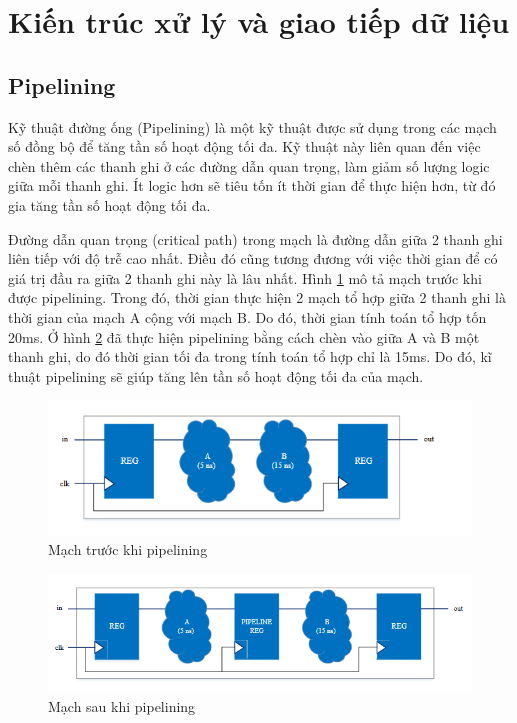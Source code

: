 \section{Kiến trúc xử lý và giao tiếp dữ liệu}
\subsection{Pipelining}
Kỹ thuật đường ống (Pipelining) là một kỹ thuật được sử dụng trong các mạch số đồng bộ để tăng tần số hoạt động tối đa. Kỹ thuật này liên quan đến việc chèn thêm các thanh ghi ở các đường dẫn quan trọng, làm giảm số lượng logic giữa mỗi thanh ghi. Ít logic hơn sẽ tiêu tốn ít thời gian để thực hiện hơn, từ đó gia tăng tần số hoạt động tối đa.

Đường dẫn quan trọng (critical path) trong mạch là đường dẫn giữa 2 thanh ghi liên tiếp với độ trễ cao nhất. Điều đó cũng tương đương với việc thời gian để có giá trị đầu ra giữa 2 thanh ghi này là lâu nhất.  Hình \ref{fig:pipeline1} mô tả mạch trước khi được pipelining. Trong đó, thời gian thực hiện 2 mạch tổ hợp giữa 2 thanh ghi là thời gian của mạch A cộng với mạch B. Do đó, thời gian tính toán tổ hợp tốn 20ms. Ở hình \ref{fig:pipeline2} đã thực hiện pipelining bằng cách chèn vào giữa A và B một thanh ghi, do đó thời gian tối đa trong tính toán tổ hợp chỉ là 15ms. Do đó, kĩ thuật pipelining sẽ giúp tăng lên tần số hoạt động tối đa của mạch. 
\begin{figure}[!ht]
    \centering
    \includegraphics[width=\linewidth]{figures/pipeline1.png}
    \caption{Mạch trước khi pipelining}
    \label{fig:pipeline1}
\end{figure}
\begin{figure}[!ht]
    \centering
    \includegraphics[width=\linewidth]{figures/pipeline2.png}
    \caption{Mạch sau khi pipelining}
    \label{fig:pipeline2}
\end{figure}
